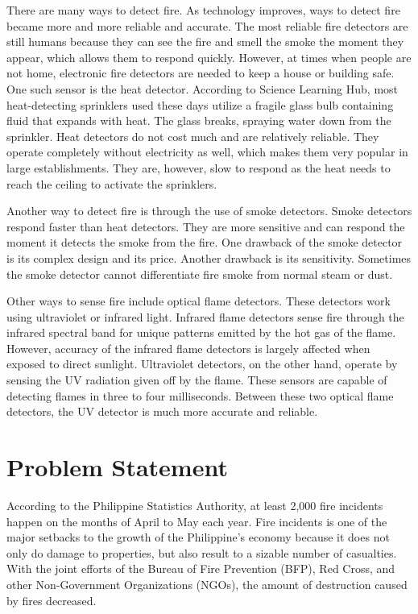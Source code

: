There are many ways to detect fire. As technology improves, ways to detect fire became more and more reliable and accurate. The most reliable fire detectors are still humans because they can see the fire and smell the smoke the moment they appear, which allows them to respond quickly. However, at times when people are not home, electronic fire detectors are needed to keep a house or building safe. One such sensor is the heat detector. According to Science Learning Hub, most heat-detecting sprinklers used these days utilize a fragile glass bulb containing fluid that expands with heat. The glass breaks, spraying water down from the sprinkler. Heat detectors do not cost much and are relatively reliable. They operate completely without electricity as well, which makes them very popular in large establishments. They are, however, slow to respond as the heat needs to reach the ceiling to activate the sprinklers.

Another way to detect fire is through the use of smoke detectors. Smoke detectors respond faster than heat detectors. They are more sensitive and can respond the moment it detects the smoke from the fire. One drawback of the smoke detector is its complex design and its price. Another drawback is its sensitivity. Sometimes the smoke detector cannot differentiate fire smoke from normal steam or dust.

Other ways to sense fire include optical flame detectors. These detectors work using ultraviolet or infrared light. Infrared flame detectors sense fire through the infrared spectral band for unique patterns emitted by the hot gas of the flame. However, accuracy of the infrared flame detectors is largely affected when exposed to direct sunlight. Ultraviolet detectors, on the other hand, operate by sensing the UV radiation given off by the flame. These sensors are capable of detecting flames in three to four milliseconds. Between these two optical flame detectors, the UV detector is much more accurate and reliable.

\section{Problem Statement}

	According to the Philippine Statistics Authority, at least 2,000 fire incidents happen on the months of April to May each year. Fire incidents is one of the major setbacks to the growth of the Philippine’s economy because it does not only do damage to properties, but also result to a sizable number of casualties. With the joint efforts of the Bureau of Fire Prevention (BFP), Red Cross, and other Non-Government Organizations (NGOs), the amount of destruction caused by fires decreased.
    

